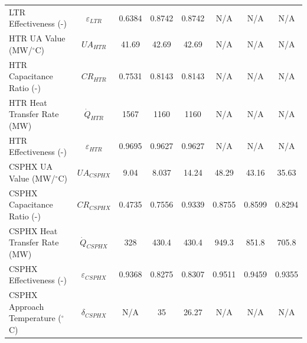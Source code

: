\begin{specialtable}[H]
{\begin{tabular}{lccccccc}
    LTR Effectiveness (-)	&	$\varepsilon_{LTR}$	&	0.6384	&	0.8742	&	0.8742	&	N/A	&	N/A	&	N/A	\\
    HTR UA Value (MW/$^{\circ}$C)	&	$UA_{HTR}$	&	41.69	&	42.69	&	42.69	&	N/A	&	N/A	&	N/A	\\
    HTR Capacitance Ratio (-)	&	$CR_{HTR}$	&	0.7531	&	0.8143	&	0.8143	&	N/A	&	N/A	&	N/A	\\
    HTR Heat Transfer Rate (MW)	&	$\dot{Q}_{HTR}$	&	1567	&	1160	&	1160	&	N/A	&	N/A	&	N/A	\\
    HTR Effectiveness (-)	&	$\varepsilon_{HTR}$	&	0.9695	&	0.9627	&	0.9627	&	N/A	&	N/A	&	N/A	\\
    CSPHX UA Value (MW/$^{\circ}$C)	&	$UA_{CSPHX}$	&	9.04	&	8.037	&	14.24	&	48.29	&	43.16	&	35.63	\\
    CSPHX Capacitance Ratio (-)	&	$CR_{CSPHX}$	&	0.4735	&	0.7556	&	0.9339	&	0.8755	&	0.8599	&	0.8294	\\
    CSPHX Heat Transfer Rate (MW)	&	$\dot{Q}_{CSPHX}$	&	328	&	430.4	&	430.4	&	949.3	&	851.8	&	705.8	\\
    CSPHX Effectiveness (-)	&	$\varepsilon_{CSPHX}$	&	0.9368	&	0.8275	&	0.8307	&	0.9511	&	0.9459	&	0.9355	\\
    CSPHX Approach Temperature ($^{\circ}$C)	&	$\delta_{CSPHX}$	&	N/A	&	35	&	26.27	&	N/A	&	N/A	&	N/A	\\
    \bottomrule
    \end{tabular}
    }
\end{specialtable}
